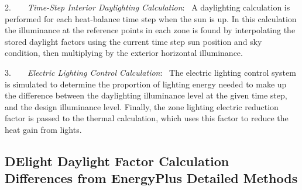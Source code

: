 2.~~~~\emph{Time-Step Interior Daylighting Calculation}:~ A daylighting calculation is performed for each heat-balance time step when the sun is up. In this calculation the illuminance at the reference points in each zone is found by interpolating the stored daylight factors using the current time step sun position and sky condition, then multiplying by the exterior horizontal illuminance.

3.~~~~\emph{Electric Lighting Control Calculation}:~ The electric lighting control system is simulated to determine the proportion of lighting energy needed to make up the difference between the daylighting illuminance level at the given time step, and the design illuminance level. Finally, the zone lighting electric reduction factor is passed to the thermal calculation, which uses this factor to reduce the heat gain from lights.

\subsection{DElight Daylight Factor Calculation Differences from EnergyPlus Detailed Methods}\label{delight-daylight-factor-calculation-differences-from-energyplus-detailed-methods}

